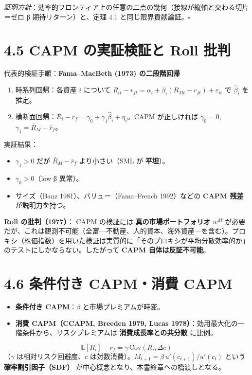 \documentclass[11pt,a4paper]{report}
\begin{document}
\emph{証明方針}：効率的フロンティア上の任意の二点の幾何（接線が縦軸と交わる切片＝ゼロ β 期待リターン）と、定理 4.1 と同じ限界貢献論証。$\square$

\section{4.5 CAPM の実証検証と Roll 批判}

代表的検証手順：\textbf{Fama–MacBeth (1973) の二段階回帰}

\begin{enumerate}
\item 時系列回帰：各資産 $i$ について $R_{it} - r_{ft} = \alpha_i + \beta_i (R_{Mt} - r_{ft}) + \varepsilon_{it}$ で $\hat\beta_i$ を推定。
\item 横断面回帰：$\bar R_i - \bar r_f = \gamma_0 + \gamma_1 \hat\beta_i + \eta_i$。CAPM が正しければ $\gamma_0 = 0$, $\gamma_1 = \bar R_M - \bar r_f$。
\end{enumerate}

実証結果：
\begin{itemize}
\item $\gamma_1 > 0$ だが $\bar R_M - \bar r_f$ より小さい（SML が \textbf{平坦}）。
\item $\gamma_0 > 0$（low β 異常）。
\item サイズ（Banz 1981）、バリュー（Fama–French 1992）などの \textbf{CAPM 残差} が説明力を持つ。
\end{itemize}

\textbf{Roll の批判（1977）}： CAPM の検証には \textbf{真の市場ポートフォリオ} $w^M$ が必要だが、これは観測不可能（全富—不動産、人的資本、海外資産—を含む）。プロキシ（株価指数）を用いた検証は実質的に「そのプロキシが平均分散効率的か」のテストにしかならない。したがって \textbf{CAPM 自体は反証不可能}。

\section{4.6 条件付き CAPM・消費 CAPM}

\begin{itemize}
\item \textbf{条件付き CAPM}：$\beta$ と市場プレミアムが時変。
\item \textbf{消費 CAPM（CCAPM, Breeden 1979, Lucas 1978）}：効用最大化の一階条件から、リスクプレミアムは \textbf{消費成長率との共分散} に比例。
\end{itemize}
\[ \mathbb{E}[R_i] - r_f = \gamma\, \mathrm{Cov}(R_i, \Delta c) \] （$\gamma$ は相対リスク回避度、$c$ は対数消費）。$M_{t+1} = \beta\, u'(c_{t+1})/u'(c_t)$ という \textbf{確率割引因子（SDF）} が中心概念となり、本書終章への橋渡しとなる。
\end{document}
